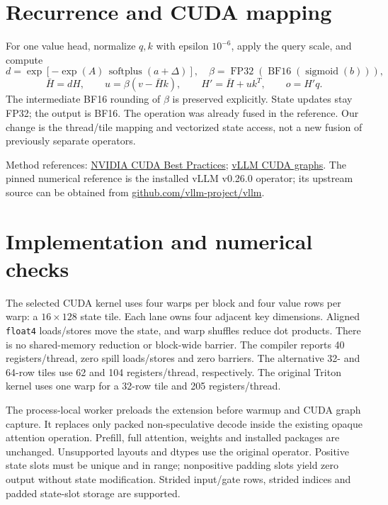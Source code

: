 \documentclass[10pt,a4paper]{article}
\begin{document}
\section{Recurrence and CUDA mapping}
For one value head, normalize $q,k$ with epsilon $10^{-6}$, apply the query scale,
and compute
\[
 d=\exp[-\exp(A)\,\operatorname{softplus}(a+\Delta)],\quad
 \beta=\operatorname{FP32}(\operatorname{BF16}(\operatorname{sigmoid}(b))),
\]
\[
 \bar H=dH,\qquad u=\beta(v-\bar Hk),\qquad H'=\bar H+uk^T,
 \qquad o=H'q.
\]
The intermediate BF16 rounding of $\beta$ is preserved explicitly. State updates
stay FP32; the output is BF16. The operation was already fused in the reference.
Our change is the thread/tile mapping and vectorized state access, not a new
fusion of previously separate operators.

{\small Method references:
\href{https://docs.nvidia.com/cuda/cuda-c-best-practices-guide/}{NVIDIA CUDA Best Practices};
\href{https://docs.vllm.ai/en/latest/design/cuda_graphs/}{vLLM CUDA graphs}.
The pinned numerical reference is the installed vLLM v0.26.0 operator; its
upstream source can be obtained from
\href{https://github.com/vllm-project/vllm}{github.com/vllm-project/vllm}.}

\newpage
\section*{Implementation and numerical checks}
The selected CUDA kernel uses four warps per block and four value rows per warp:
a $16\times128$ state tile. Each lane owns four adjacent key dimensions. Aligned
\texttt{float4} loads/stores move the state, and warp shuffles reduce dot products.
There is no shared-memory reduction or block-wide barrier. The compiler reports
40 registers/thread, zero spill loads/stores and zero barriers. The alternative
32- and 64-row tiles use 62 and 104 registers/thread, respectively. The original
Triton kernel uses one warp for a 32-row tile and 205 registers/thread.

The process-local worker preloads the extension before warmup and CUDA graph
capture. It replaces only packed non-speculative decode inside the existing
opaque attention operation. Prefill, full attention, weights and installed
packages are unchanged. Unsupported layouts and dtypes use the original
operator. Positive state slots must be unique and in range; nonpositive padding
slots yield zero output without state modification. Strided input/gate rows,
strided indices and padded state-slot storage are supported.
\end{document}
